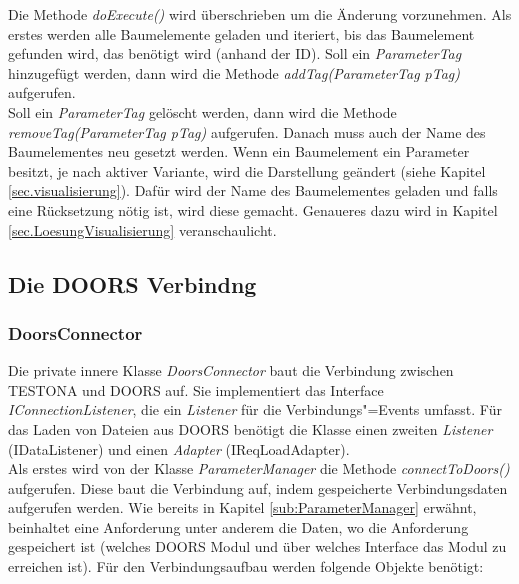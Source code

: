 Die Methode \textit{doExecute()} wird überschrieben um die Änderung vorzunehmen. Als erstes werden alle Baumelemente geladen und iteriert, bis das Baumelement gefunden wird, das benötigt wird (anhand der ID). Soll ein \textit{ParameterTag} hinzugefügt werden, dann wird die Methode \textit{addTag(ParameterTag pTag)} aufgerufen.\\


Soll ein \textit{ParameterTag} gelöscht werden, dann wird die Methode \textit{removeTag(ParameterTag pTag)} aufgerufen. Danach muss auch der Name des Baumelementes neu gesetzt werden. Wenn ein Baumelement ein Parameter besitzt, je nach aktiver Variante, wird die Darstellung geändert (siehe Kapitel \ref{sec.visualisierung}). Dafür wird der Name des Baumelementes geladen und falls eine Rücksetzung nötig ist, wird diese gemacht. Genaueres dazu wird in Kapitel \ref{sec.LoesungVisualisierung} veranschaulicht.\\

\subsection{Die DOORS Verbindng}\label{sub.DoorsConn}
\subsubsection{DoorsConnector}


Die private innere Klasse \textit{DoorsConnector} baut die Verbindung zwischen TESTONA und DOORS auf. Sie implementiert das Interface \textit{IConnectionListener}, die ein \textit{Listener} für die Verbindungs"=Events umfasst. Für das Laden von Dateien aus DOORS benötigt die Klasse einen zweiten \textit{Listener} (IDataListener) und einen \textit{Adapter} (IReqLoadAdapter). \\

Als erstes wird von der Klasse \textit{ParameterManager} die Methode \textit{connectToDoors()} aufgerufen. Diese baut die Verbindung auf, indem gespeicherte Verbindungsdaten aufgerufen werden. Wie bereits in Kapitel \ref{sub:ParameterManager} erwähnt, beinhaltet eine Anforderung unter anderem die Daten, wo die Anforderung gespeichert ist (welches DOORS Modul und über welches Interface das Modul zu erreichen ist). Für den Verbindungsaufbau werden folgende Objekte benötigt:

